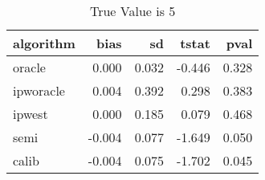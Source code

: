 \begin{table}

\caption{True Value is 5}
\centering
\begin{tabular}[t]{lrrrr}
\toprule
algorithm & bias & sd & tstat & pval\\
\midrule
oracle & 0.000 & 0.032 & -0.446 & 0.328\\
ipworacle & 0.004 & 0.392 & 0.298 & 0.383\\
ipwest & 0.000 & 0.185 & 0.079 & 0.468\\
semi & -0.004 & 0.077 & -1.649 & 0.050\\
calib & -0.004 & 0.075 & -1.702 & 0.045\\
\bottomrule
\end{tabular}
\end{table}